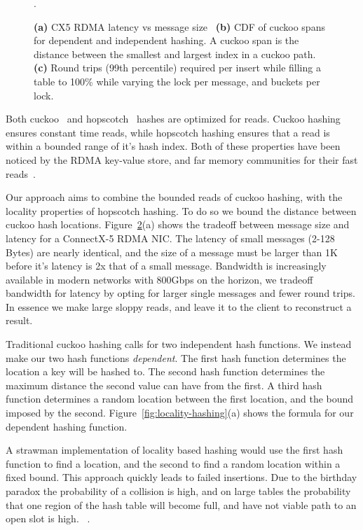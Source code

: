 \begin{figure}[t]
\begin{subfigure}{0.3\linewidth}
        \label{fig:tbd}
    \end{subfigure}.
    \vspace{-1em}
    \caption{
    \textbf{(a)} CX5 RDMA latency vs message size~\cite{rdma-latency}
    \textbf{(b)} CDF of cuckoo spans for dependent and independent hashing. A cuckoo span is the distance between the smallest and largest index in a cuckoo path.
    \textbf{(c)} Round trips (99th percentile) required per insert while filling a table to 100\% while varying the lock per message, and buckets per lock.
    }
    \label{fig:rdma}

\end{figure}


Both cuckoo~\cite{cuckoo} and hopscotch~\cite{hopscotch}
hashes are optimized for reads. Cuckoo hashing ensures
constant time reads, while hopscotch hashing ensures that a
read is within a bounded range of it's hash index. Both of
these properties have been noticed by the RDMA key-value
store, and far memory communities for their fast
reads~\cite{memc3,cuckoo-improvements,pilaf,farm}.

Our approach aims to combine the bounded reads of cuckoo
hashing, with the locality properties of hopscotch hashing.
To do so we bound the distance between cuckoo hash
locations. Figure~\ref{fig:rdma}(a) shows the tradeoff
between message size and latency for a ConnectX-5 RDMA NIC.
The latency of small messages (2-128 Bytes) are nearly
identical, and the size of a message must be larger than 1K
before it's latency is 2x that of a small message. Bandwidth
is increasingly available in modern networks with 800Gbps on
the horizon, we tradeoff bandwidth for latency by opting for
larger single messages and fewer round trips. In essence we
make large sloppy reads, and leave it to the client to
reconstruct a result.

Traditional cuckoo hashing calls for two independent hash
functions. We instead make our two hash functions
\textit{dependent}. The first hash function determines the
location a key will be hashed to. The second hash function
determines the maximum distance the second value can have
from the first. A third hash function determines a random
location between the first location, and the bound imposed
by the second. Figure~\ref{fig:locality-hashing}(a) shows
the formula for our dependent hashing function.

A strawman implementation of locality based hashing would
use the first hash function to find a location, and the
second to find a random location within a fixed bound. This
approach quickly leads to failed insertions. Due to the
birthday paradox the probability of a collision is high, and
on large tables the probability that one region of the hash
table will become full, and have not viable path to an open
slot is high. ~.

